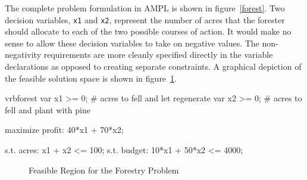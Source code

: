 \documentclass[12pt]{book}
\begin{document}
The complete problem formulation in AMPL is shown in
figure~\ref{forest}.  Two decision variables, \texttt{x1} and
\texttt{x2}, represent the number of acres that the forester should
allocate to each of the two possible courses of action.  It would make
no sense to allow these decision variables to take on negative
values. The non-negativity requirements are more cleanly specified
directly in the variable declarations as opposed to creating separate
constraints. A graphical depiction of the feasible solution space is
shown in figure~\ref{feasibleregion}.

\begin{SaveVerbatim}{vrbforest}
var x1 >= 0;  # acres to fell and let regenerate
var x2 >= 0;  # acres to fell and plant with pine

maximize profit: 40*x1 + 70*x2;

s.t. acres: x1 + x2 <= 100;
s.t. budget: 10*x1 + 50*x2 <= 4000;
\end{SaveVerbatim}

\begin{figure}
\end{figure}

\begin{figure}
\begin{center}
\end{center}
\caption{Feasible Region for the Forestry Problem}
\label{feasibleregion}
\end{figure}
\end{document}
